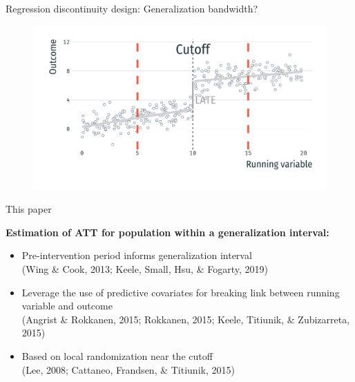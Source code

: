 \documentclass[usenames,dvipsnames,11pt,aspectratio=169]{beamer}
\begin{document}
\begin{frame}{Regression discontinuity design: Generalization bandwidth?}
\begin{figure}[!htb]
\centering
    \includegraphics[width=.9\textwidth]{figures/ex4.pdf}
\end{figure}
\end{frame}

\begin{frame}{This paper}

\textbf{Estimation of ATT for population within a generalization interval:}
	\begin{itemize}
		\item Pre-intervention period informs generalization interval \\ {\tiny (Wing \& Cook, 2013; Keele, Small, Hsu, \& Fogarty, 2019)}
			\vspace{0.1cm}
        \item Leverage the use of predictive covariates for breaking link between running variable and outcome \\ {\tiny (Angrist \& Rokkanen, 2015; Rokkanen, 2015; Keele, Titiunik, \& Zubizarreta, 2015)}
        \vspace{0.1cm}
		\item Based on local randomization near the cutoff \\ {\tiny (Lee, 2008; Cattaneo, Frandsen, \& Titiunik, 2015)}
	\end{itemize}
\end{frame}
\end{document}
